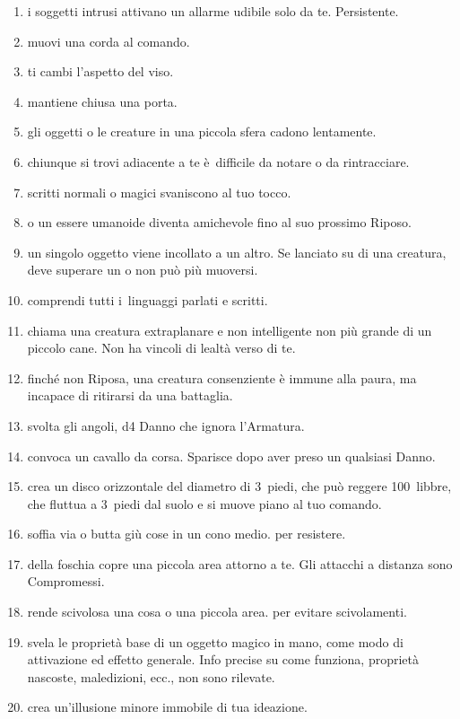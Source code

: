 \documentclass[itdr]{subfiles}
\begin{document}
\begin{enumerate}
	\item {} i soggetti intrusi attivano un allarme udibile solo da te. Persistente.
	\item {} muovi una corda al comando.
	\item {} ti cambi l’aspetto del viso.
	\item {} mantiene chiusa una porta.
	\item {} gli oggetti o le creature in una piccola sfera cadono lentamente.
	\item {} chiunque si trovi adiacente a te è~difficile da notare o da rintracciare.
	\item {} scritti normali o magici svaniscono al tuo tocco.
	\item {}  o un essere umanoide diventa amichevole fino al suo prossimo Riposo.
	\item {} un singolo oggetto viene incollato a un altro. Se lanciato su di una creatura, deve superare un  o non può più muoversi.
	\item {} comprendi tutti i~linguaggi parlati e scritti.
	\item {} chiama una creatura extraplanare e non intelligente non più grande di un piccolo cane. Non ha vincoli di lealtà verso di te.
	\item {} finché non Riposa, una creatura consenziente è immune alla paura, ma incapace di ritirarsi da una battaglia.
	\item {} svolta gli angoli, d4 Danno che ignora l’Armatura.
	\item {} convoca un cavallo da corsa. Sparisce dopo aver preso un qualsiasi Danno.
	\item {} crea un disco orizzontale del diametro di 3~piedi, che può reggere 100~libbre, che fluttua a 3~piedi dal suolo e si muove piano al tuo comando.
	\item {} soffia via o butta giù cose in un cono medio.  per resistere.
	\item {} della foschia copre una piccola area attorno a te. Gli attacchi a distanza sono Compromessi.
	\item {} rende scivolosa una cosa o una piccola area.  per evitare scivolamenti.
	\item {} svela le proprietà base di un oggetto magico in mano, come modo di attivazione ed effetto generale. Info precise su come funziona, proprietà nascoste, maledizioni, ecc., non sono rilevate.
	\item {} crea un’\mbox{illusione} minore immobile di tua ideazione.
	

\end{enumerate}
\end{document}
